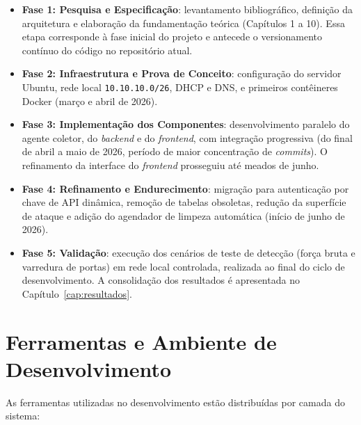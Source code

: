 \documentclass[
    12pt
    ,oneside
    ,a4paper
    ,chapter=TITLE
    ,section=TITLE
    ,sumario=abnt-6027-2012]{abntex2}
\begin{document}
\begin{itemize}
    \item \textbf{Fase 1: Pesquisa e Especificação}: levantamento bibliográfico, definição da arquitetura e elaboração da fundamentação teórica (Capítulos 1 a 10). Essa etapa corresponde à fase inicial do projeto e antecede o versionamento contínuo do código no repositório atual.
    \item \textbf{Fase 2: Infraestrutura e Prova de Conceito}: configuração do
          servidor Ubuntu, rede local \texttt{10.10.10.0/26}, DHCP e DNS, e primeiros
          contêineres Docker (março e abril de 2026).
    \item \textbf{Fase 3: Implementação dos Componentes}: desenvolvimento paralelo do
          agente coletor, do \textit{backend} e do \textit{frontend}, com integração
          progressiva (do final de abril a maio de 2026, período de maior concentração de
          \textit{commits}). O refinamento da interface do \textit{frontend} prosseguiu
          até meados de junho.
    \item \textbf{Fase 4: Refinamento e Endurecimento}: migração para autenticação por
          chave de API dinâmica, remoção de tabelas obsoletas, redução da superfície de
          ataque e adição do agendador de limpeza automática (início de junho de 2026).
    \item \textbf{Fase 5: Validação}: execução dos cenários de teste de detecção
          (força bruta e varredura de portas) em rede local controlada, realizada ao final
          do ciclo de desenvolvimento. A consolidação dos resultados é apresentada no
          Capítulo~\ref{cap:resultados}.
\end{itemize}

\section{Ferramentas e Ambiente de Desenvolvimento}
\label{sec:ferramentas}

As ferramentas utilizadas no desenvolvimento estão distribuídas por camada do sistema:
\end{document}
